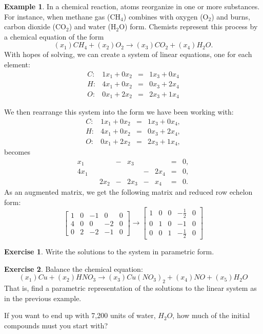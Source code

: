 \documentclass[handout]{beamer}
\newcommand{\fn}{\insertframenumber}
\theoremstyle{definition}
\newtheorem{exercise}{Exercise}
\newtheorem*{exa}{Example}
\begin{document}
\begin{frame}{\insertframenumber}
\begin{exa}
	In a chemical reaction, atoms reorganize in one or more substances.  For instance, when methane gas (CH$_4$) combines with oxygen (O$_2$) and burns, carbon dioxide (CO$_2$) and water (H$_2$O) form.  Chemists represent this process by a chemical equation of the form	
	\[(x_1){CH}_4+(x_2){O}_2\rightarrow(x_3){CO}_2 + (x_4){H}_2{O}.\]
	With hopes of solving, we can create a system of linear equations, one for each element:
	$$\begin{array}{rrcl}
		C:&1x_1+0x_2&=&1x_3+0x_4\\
		H:&4x_1+0x_2&=&0x_3+2x_4\\
		O:&0x_1+2x_2&=&2x_3+1x_4
	\end{array}
	$$
\end{exa}
\end{frame}

\begin{frame}{\fn}
	We then rearrange this system into the form we have been working with:
		$$\begin{array}{rrcl}
	C:&1x_1+0x_2&=&1x_3+0x_4,\\
	H:&4x_1+0x_2&=&0x_3+2x_4,\\
	O:&0x_1+2x_2&=&2x_3+1x_4,
	\end{array}$$
	becomes
	$$\begin{array}{rcrcrcrcl}
	x_1&&&-&x_3&&&=&0,\\
	4x_1&&&&&-&2x_4&=&0,\\
	&&2x_2&-&2x_3&-&x_4&=&0.
	\end{array}
	$$
	As an augmented matrix, we get the following matrix and reduced row echelon form:
	\[\begin{bmatrix}
	1&0&-1&0&0\\4&0&0&-2&0\\0&2&-2&-1&0
	\end{bmatrix}\rightarrow
	\begin{bmatrix}
	1 & 0 & 0 & -\frac{1}{2} & 0 \\
	0 & 1 & 0 & -1 & 0 \\
	0 & 0 & 1 & -\frac{1}{2} & 0
	\end{bmatrix}\]
	\begin{exercise}
		Write the solutions to the system in parametric form.
	\end{exercise}
\end{frame}

\begin{frame}
	\begin{exercise}
		Balance the chemical equation:	
			\[(x_1)Cu+(x_2)HNO_3\rightarrow (x_3)Cu(NO_3)_2+(x_4)NO+(x_5)H_2O\]
		That is, find a parametric representation of the solutions to the linear system as in the previous example.
		
		If you want to end up with 7,200 units of water, $H_2O$, how much of the initial compounds must you start with?
	\end{exercise}
\end{frame}
\end{document}
